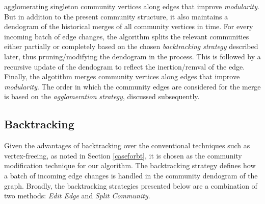 \documentclass[conference]{IEEEtran}
\begin{document}
agglomerating singleton community vertices along edges that improve 
\emph{modularity}. But in addition to the present community structure, it also 
maintains a dendogram of the historical merges of all community vertices in 
time. 
For every incoming batch of edge changes, the algorithm splits the relevant 
communities either partially or completely based on the chosen 
\textit{backtracking strategy} described later, thus pruning/modifying the 
dendogram in the process. This is followed by a recursive update of the 
dendogram to reflect the inertion/remval of the edge. Finally, the algotithm 
merges community vertices along edges that improve \emph{modularity}. The order 
in 
which the community edges are considered for the merge is based on the 
\textit{agglomeration strategy}, discussed subsequently. 
\subsection{Backtracking}
Given the advantages of backtracking over the conventional 
 techniques such as vertex-freeing, as noted in Section 
\ref{caseforbt}, it is chosen as the community modification technique 
for our algorithm. The backtracking strategy defines how a batch of incoming 
edge changes is handled in the community dendogram of the graph. Broadly, the
backtracking strategies presented below are a combination of two methods: 
\emph{Edit Edge} and \emph{Split Community}.
\vspace{0.2cm}
\end{document}
